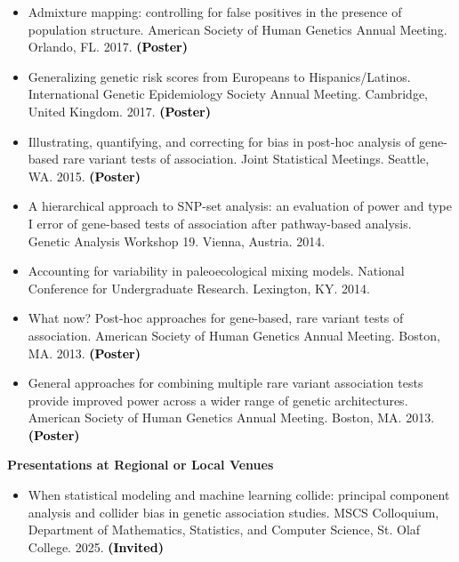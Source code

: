 \documentclass[margin]{res}
\newcommand{\annotate}[1]{\textcolor{black}{\textbf{(#1)}}}
\begin{document}
\begin{resume}
\begin{itemize}
\item[7.] Admixture mapping: controlling for false positives in the presence of population structure. 
American Society of Human Genetics Annual Meeting. Orlando, FL. 2017. 
\annotate{Poster}

\item[6.] Generalizing genetic risk scores from Europeans to Hispanics/Latinos. 
International Genetic Epidemiology Society Annual Meeting. Cambridge, United Kingdom. 2017. 
\annotate{Poster}

\item[5.] Illustrating, quantifying, and correcting for bias in post-hoc analysis of gene-based rare variant tests of association. 
Joint Statistical Meetings. Seattle, WA. 2015.
\annotate{Poster}

\item[4.] A hierarchical approach to SNP-set analysis: an evaluation of power and type I error of gene-based tests of association after pathway-based analysis. 
Genetic Analysis Workshop 19. Vienna, Austria. 2014.

\item[3.] Accounting for variability in paleoecological mixing models. 
National Conference for Undergraduate Research. Lexington, KY. 2014.

\item[2.] What now? Post-hoc approaches for gene-based, rare variant tests of association. 
American Society of Human Genetics Annual Meeting. Boston, MA. 2013. 
\annotate{Poster}

\item[1.] General approaches for combining multiple rare variant association tests provide improved power across a wider range of genetic architectures. 
American Society of Human Genetics Annual Meeting. Boston, MA. 2013. 
\annotate{Poster}

\end{itemize}





\textbf{Presentations at Regional or Local Venues} 

\begin{itemize}

\item[25.] When statistical modeling and machine learning collide: principal component analysis and collider bias in genetic association studies. MSCS Colloquium, Department of Mathematics, Statistics, and Computer Science, St. Olaf College. 2025.
\annotate{Invited}


\end{itemize}
\end{resume}
\end{document}
